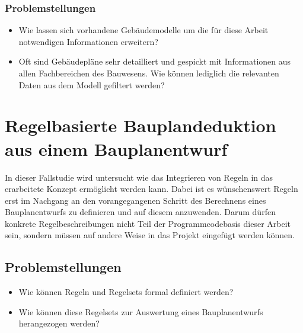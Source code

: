 \subsubsection*{Problemstellungen}
\begin{itemize}
  \item Wie lassen sich vorhandene Gebäudemodelle um die für diese Arbeit notwendigen Informationen erweitern?
  \item Oft sind Gebäudepläne sehr detailliert und gespickt mit Informationen aus allen Fachbereichen des Bauwesens. Wie können lediglich die relevanten Daten aus dem Modell gefiltert werden?
\end{itemize}

\section{Regelbasierte Bauplandeduktion aus einem Bauplanentwurf}\label{scenarios:scenario4}
In dieser Fallstudie wird untersucht wie das Integrieren von Regeln in das erarbeitete Konzept ermöglicht werden kann.
Dabei ist es wünschenswert Regeln erst im Nachgang an den vorangegangenen Schritt des Berechnens eines Bauplanentwurfs zu definieren und auf diesem anzuwenden.
Darum dürfen konkrete Regelbeschreibungen nicht Teil der Programmcodebasis dieser Arbeit sein, sondern müssen auf andere Weise in das Projekt eingefügt werden können.

\subsection*{Problemstellungen}
\begin{itemize}
  \item Wie können Regeln und Regelsets formal definiert werden?
  \item Wie können diese Regelsets zur Auswertung eines Bauplanentwurfs herangezogen werden?
\end{itemize}